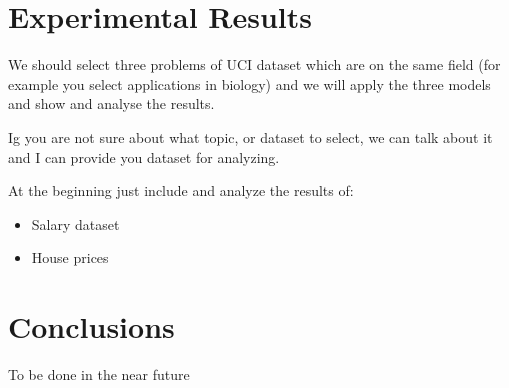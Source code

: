 \documentclass[11pt]{article}
\newcommand{\msb}[1]{{\color{blue}#1}}
\begin{document}
\section{Experimental Results}
We should select three problems of UCI dataset which are on the same field (for example you select applications in biology) and we will apply the three models and show and analyse the results.

Ig you are not sure about what topic, or dataset to select, we can talk about it and I can provide you dataset for analyzing.

At the beginning just include and analyze the results of:
\begin{itemize}
\item Salary dataset
\item House prices
\end{itemize}


\section{Conclusions}
\msb{To be done in the near future}


%

\end{document}
